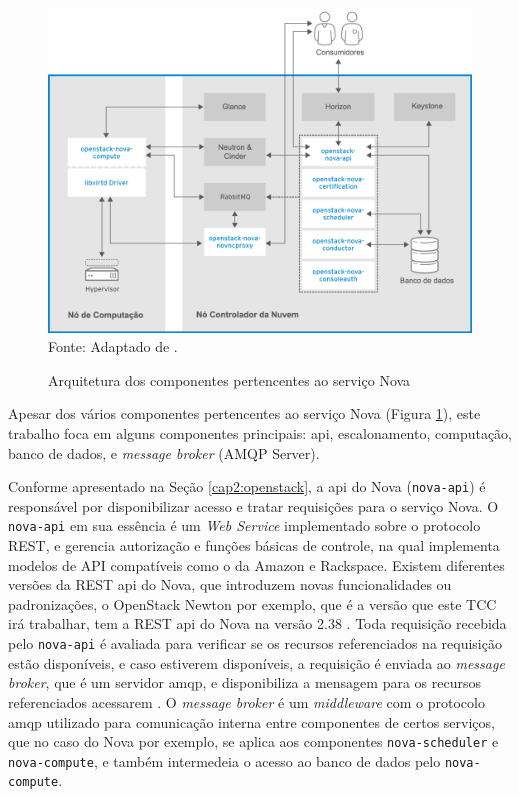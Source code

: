 \begin{figure}[!htb]
	\centering
	\caption{Arquitetura dos componentes pertencentes ao serviço Nova}
    \vspace{-0.3cm}
	\includegraphics[width=.8\textwidth]{img/nova_arquitetura.png}
	\label{fig:nova_architecture}\\
	Fonte: Adaptado de \cite{redhat:components}.
\end{figure}

Apesar dos vários componentes pertencentes ao serviço Nova (Figura \ref{fig:nova_architecture}), este trabalho foca em alguns componentes principais: \ac{api}, escalonamento, computação, banco de dados, e \textit{message broker} (AMQP Server).

Conforme apresentado na Seção \ref{cap2:openstack}, a \ac{api} do Nova (\texttt{nova-api}) é responsável por disponibilizar acesso e tratar requisições para o serviço Nova.
%
O \texttt{nova-api} em sua essência é um \textit{Web Service} implementado sobre o protocolo REST, e gerencia autorização e funções básicas de controle, na qual implementa modelos de API compatíveis como o da Amazon e Rackspace.
%
Existem diferentes versões da REST \ac{api} do Nova, que introduzem novas funcionalidades ou padronizações, o OpenStack Newton por exemplo, que é a versão que este TCC irá trabalhar, tem a REST \ac{api} do Nova na versão 2.38 \cite{openstack:newton:api}.
%
Toda requisição recebida pelo \texttt{nova-api} é avaliada para verificar se os recursos referenciados na requisição estão disponíveis, e caso estiverem disponíveis, a requisição é enviada ao \textit{message broker}, que é um servidor \acf{amqp}, e disponibiliza a mensagem para os recursos referenciados acessarem \cite{openstack:nova}.
%
O \textit{message broker} é um \textit{middleware} com o protocolo \ac{amqp} utilizado para comunicação interna entre componentes de certos serviços, que no caso do Nova por exemplo, se aplica aos componentes \texttt{nova-scheduler} e \texttt{nova-compute}, e também intermedeia o acesso ao banco de dados pelo \texttt{nova-compute}.

